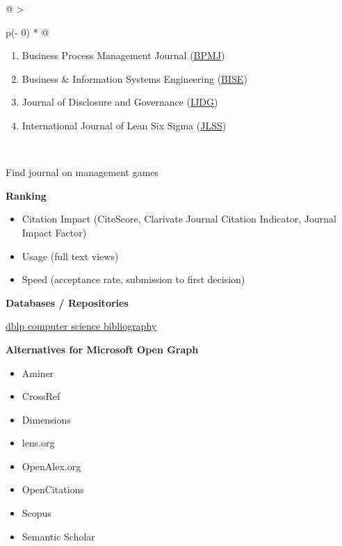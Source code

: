 \documentclass[
  letterpaper,
  DIV=11,
  numbers=noendperiod]{scrreprt}
\providecommand{\tightlist}{%
  \setlength{\itemsep}{0pt}\setlength{\parskip}{0pt}}\usepackage{longtable,booktabs,array}
\begin{document}
\hypertarget{tbl-journalsb}{}
\begin{longtable}[]{@{}
  >{\raggedright\arraybackslash}p{(\columnwidth - 0\tabcolsep) * }@{}}
\caption{\label{tbl-journalsb}Other journals}\tabularnewline
\toprule\noalign{}
\endfirsthead
\endhead
\bottomrule\noalign{}
\endlastfoot
\begin{minipage}[t]{\linewidth}\raggedright
\begin{enumerate}
\def\labelenumi{\arabic{enumi}.}
\tightlist
\item
  Business Process Management Journal
  (\href{https://www.emeraldgrouppublishing.com/journal/bpmj}{BPMJ})
\item
  Business \& Information Systems Engineering
  (\href{http://www.bise-journal.com/}{BISE})
\item
  Journal of Disclosure and Governance
  (\href{https://www.palgrave.com/gp/journal/41310}{IJDG})
\item
  International Journal of Lean Six Sigma
  (\href{https://www.emeraldgrouppublishing.com/journal/ijlss}{JLSS})
\end{enumerate}
\end{minipage} \\
\end{longtable}

Find journal on management games

\textbf{Ranking}

\begin{itemize}
\item
  Citation Impact (CiteScore, Clarivate Journal Citation Indicator,
  Journal Impact Factor)
\item
  Usage (full text views)
\item
  Speed (acceptance rate, submission to first decision)
\end{itemize}

\textbf{Databases / Repositories}

\href{dblp.org}{dblp computer science bibliography}

\textbf{Alternatives for Microsoft Open Graph}

\begin{itemize}
\tightlist
\item
  Aminer
\item
  CrossRef
\item
  Dimensions
\item
  lens.org
\item
  OpenAlex.org
\item
  OpenCitations
\item
  Scopus
\item
  Semantic Scholar
\end{itemize}
\end{document}
